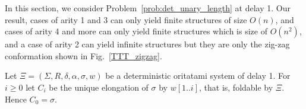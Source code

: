 



In this section, we consider Problem~\ref{prob:det_unary_length} at delay 1. Our result, cases of arity 1 and 3 can only yield finite structures of size $O (n)$, and cases of arity 4 and more can only yield finite structures which is size of $O (n^2)$, and a case of arity 2 can yield infinite structures but they are only the zig-zag conformation shown in Fig.~\ref{TTT_zigzag}. 



Let $\Xi = (\Sigma, R, \delta, \alpha, \sigma, w)$ be a deterministic oritatami system of delay 1. 
For $i \geq 0$ let $C_i$ be the unique elongation of $\sigma$ by $w[1..i]$, that is, foldable by $\Xi$. Hence $C_0 = \sigma$.


